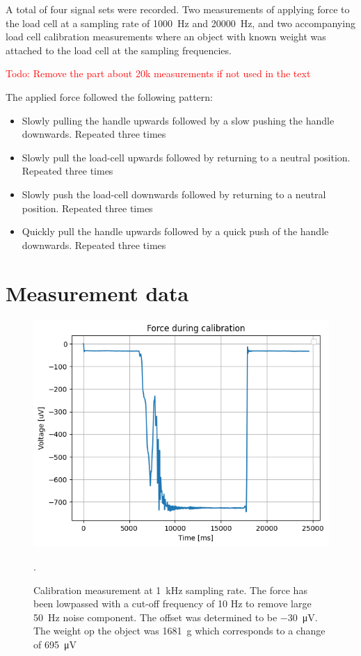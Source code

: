 A total of four signal sets were recorded. Two measurements of applying force to the load cell at a sampling rate of \SI{1000}{\hertz} and \SI{20000}{\hertz}, and two accompanying load cell calibration measurements where an object with known weight was attached to the load cell at the sampling frequencies.

\textcolor{red}{Todo: Remove the part about 20k measurements if not used in the text}

The applied force followed the following pattern:
\begin{itemize}
    \item Slowly pulling the handle upwards followed by a slow pushing the handle downwards. Repeated three times
    \item Slowly pull the load-cell upwards followed by returning to a neutral position. Repeated three times
    \item Slowly push the load-cell downwards followed by returning to a neutral position. Repeated three times
    \item Quickly pull the handle upwards followed by a quick push of the handle downwards. Repeated three times
\end{itemize}

\section{Measurement data}

\begin{figure}[h!t]
	\begin{center}
		\includegraphics[width=0.8\columnwidth]{images/measurement_calibratie3_1k.png}
	\end{center}
	\caption{Calibration measurement at \SI{1}{\kilo\hertz} sampling rate. The force has been lowpassed with a cut-off frequency of 10 Hz to remove large \SI{50}{\hertz} noise component. The offset was determined to be \SI{-30}{\micro\volt}. The weight op the object was \SI{1681}{\gram} which corresponds to a change of \SI{695}{\micro\volt}}.
	\label{fig:calibration_1k}
\end{figure}

